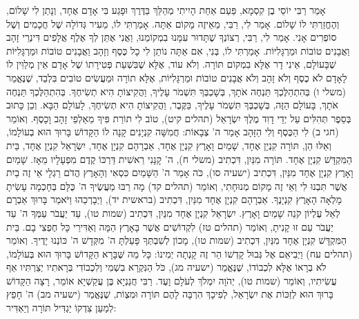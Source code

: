 אָמַר רַבִּי יוֹסֵי בֶן קִסְמָא, פַּעַם אַחַת הָיִיתִי מְהַלֵּךְ בַּדֶּרֶךְ וּפָגַע בִּי אָדָם אֶחָד, וְנָתַן לִי שָׁלוֹם, וְהֶחֱזַרְתִּי לוֹ שָׁלוֹם. אָמַר לִי, רַבִּי, מֵאֵיזֶה מָקוֹם אַתָּה. אָמַרְתִּי לוֹ, מֵעִיר גְּדוֹלָה שֶׁל חֲכָמִים וְשֶׁל סוֹפְרִים אָנִי. אָמַר לִי, רַבִּי, רְצוֹנְךָ שֶׁתָּדוּר עִמָּנוּ בִמְקוֹמֵנוּ, וַאֲנִי אֶתֵּן לְךָ אֶלֶף אֲלָפִים דִּינְרֵי זָהָב וַאֲבָנִים טוֹבוֹת וּמַרְגָּלִיּוֹת. אָמַרְתִּי לוֹ, בְּנִי, אִם אַתָּה נוֹתֵן לִי כָל כֶּסֶף וְזָהָב וַאֲבָנִים טוֹבוֹת וּמַרְגָּלִיּוֹת שֶׁבָּעוֹלָם, אֵינִי דָר אֶלָּא בִמְקוֹם תּוֹרָה. וְלֹא עוֹד, אֶלָּא שֶׁבִּשְׁעַת פְּטִירָתוֹ שֶׁל אָדָם אֵין מְלַוִּין לוֹ לָאָדָם לֹא כֶסֶף וְלֹא זָהָב וְלֹא אֲבָנִים טוֹבוֹת וּמַרְגָּלִיּוֹת, אֶלָּא תוֹרָה וּמַעֲשִׂים טוֹבִים בִּלְבַד, שֶׁנֶּאֱמַר (משלי ו) בְּהִתְהַלֶּכְךָ תַּנְחֶה אֹתָךְ, בְּשָׁכְבְּךָ תִּשְׁמֹר עָלֶיךָ, וַהֲקִיצוֹתָ הִיא תְשִׂיחֶךָ. בְּהִתְהַלֶּכְךָ תַּנְחֶה אֹתָךְ, בָּעוֹלָם הַזֶּה, בְּשָׁכְבְּךָ תִּשְׁמֹר עָלֶיךָ, בַּקֶּבֶר, וַהֲקִיצוֹתָ הִיא תְשִׂיחֶךָ, לָעוֹלָם הַבָּא. וְכֵן כָּתוּב בְּסֵפֶר תְּהִלִּים עַל יְדֵי דָוִד מֶלֶךְ יִשְׂרָאֵל (תהלים קיט), טוֹב לִי תוֹרַת פִּיךָ מֵאַלְפֵי זָהָב וָכָסֶף. וְאוֹמֵר (חגי ב) לִי הַכֶּסֶף וְלִי הַזָּהָב אָמַר ה' צְבָאוֹת:
חֲמִשָּׁה קִנְיָנִים קָנָה לוֹ הַקָּדוֹשׁ בָּרוּךְ הוּא בְעוֹלָמוֹ, וְאֵלּוּ הֵן, תּוֹרָה קִנְיָן אֶחָד, שָׁמַיִם וָאָרֶץ קִנְיָן אֶחָד, אַבְרָהָם קִנְיָן אֶחָד, יִשְׂרָאֵל קִנְיָן אֶחָד, בֵּית הַמִּקְדָּשׁ קִנְיָן אֶחָד. תּוֹרָה מִנַּיִן, דִּכְתִיב (משלי ח), ה' קָנָנִי רֵאשִׁית דַּרְכּוֹ קֶדֶם מִפְעָלָיו מֵאָז. שָׁמַיִם וָאָרֶץ קִנְיָן אֶחָד מִנַּיִן, דִּכְתִיב (ישעיה סו), כֹּה אָמַר ה' הַשָּׁמַיִם כִּסְאִי וְהָאָרֶץ הֲדֹם רַגְלָי אֵי זֶה בַיִת אֲשֶׁר תִּבְנוּ לִי וְאֵי זֶה מָקוֹם מְנוּחָתִי, וְאוֹמֵר (תהלים קד) מָה רַבּוּ מַעֲשֶׂיךָ ה' כֻּלָּם בְּחָכְמָה עָשִׂיתָ מָלְאָה הָאָרֶץ קִנְיָנֶךָ. אַבְרָהָם קִנְיָן אֶחָד מִנַּיִן, דִּכְתִיב (בראשית יד), וַיְבָרְכֵהוּ וַיֹּאמַר בָּרוּךְ אַבְרָם לְאֵל עֶלְיוֹן קֹנֵה שָׁמַיִם וָאָרֶץ. יִשְׂרָאֵל קִנְיָן אֶחָד מִנַּיִן, דִּכְתִיב (שמות טו), עַד יַעֲבֹר עַמְּךָ ה' עַד יַעֲבֹר עַם זוּ קָנִיתָ, וְאוֹמֵר (תהלים טז) לִקְדוֹשִׁים אֲשֶׁר בָּאָרֶץ הֵמָּה וְאַדִּירֵי כָּל חֶפְצִי בָם. בֵּית הַמִּקְדָּשׁ קִנְיָן אֶחָד מִנַּיִן, דִּכְתִיב (שמות טו), מָכוֹן לְשִׁבְתְּךָ פָּעַלְתָּ ה' מִקְּדָשׁ ה' כּוֹנְנוּ יָדֶיךָ. וְאוֹמֵר (תהלים עח) וַיְבִיאֵם אֶל גְּבוּל קָדְשׁוֹ הַר זֶה קָנְתָה יְמִינוֹ:
כָּל מַה שֶּׁבָּרָא הַקָּדוֹשׁ בָּרוּךְ הוּא בְּעוֹלָמוֹ, לֹא בְרָאוֹ אֶלָּא לִכְבוֹדוֹ, שֶׁנֶּאֱמַר (ישעיה מג), כֹּל הַנִּקְרָא בִשְׁמִי וְלִכְבוֹדִי בְּרָאתִיו יְצַרְתִּיו אַף עֲשִׂיתִיו, וְאוֹמֵר (שמות טו), יְהֹוָה יִמְלֹךְ לְעֹלָם וָעֶד. רַבִּי חֲנַנְיָא בֶּן עֲקַשְׁיָא אוֹמֵר, רָצָה הַקָּדוֹשׁ בָּרוּךְ הוּא לְזַכּוֹת אֶת יִשְׂרָאֵל, לְפִיכָךְ הִרְבָּה לָהֶם תּוֹרָה וּמִצְוֹת, שֶׁנֶּאֱמַר (ישעיה מב) ה' חָפֵץ לְמַעַן צִדְקוֹ יַגְדִּיל תּוֹרָה וְיַאְדִּיר:
